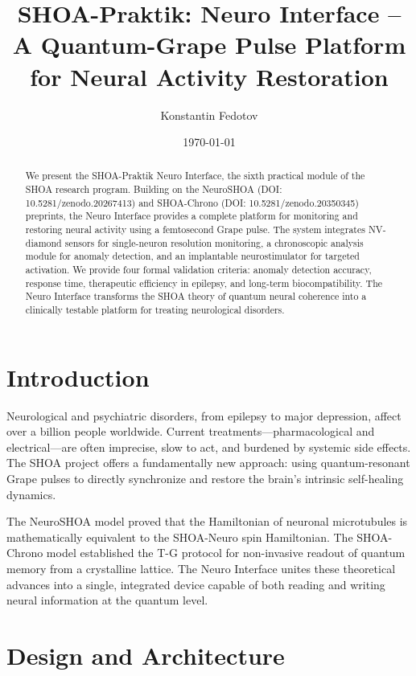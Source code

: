 \documentclass[12pt]{article}
\title{SHOA-Praktik: Neuro Interface -- A Quantum-Grape Pulse Platform for Neural Activity Restoration}
\author{Konstantin Fedotov}
\date{\today}
\begin{document}
\maketitle

\begin{abstract}
We present the SHOA-Praktik Neuro Interface, the sixth practical module of the SHOA research program. Building on the NeuroSHOA (DOI: 10.5281/zenodo.20267413) and SHOA-Chrono (DOI: 10.5281/zenodo.20350345) preprints, the Neuro Interface provides a complete platform for monitoring and restoring neural activity using a femtosecond Grape pulse. The system integrates NV-diamond sensors for single-neuron resolution monitoring, a chronoscopic analysis module for anomaly detection, and an implantable neurostimulator for targeted activation. We provide four formal validation criteria: anomaly detection accuracy, response time, therapeutic efficiency in epilepsy, and long-term biocompatibility. The Neuro Interface transforms the SHOA theory of quantum neural coherence into a clinically testable platform for treating neurological disorders.
\end{abstract}

\section{Introduction}
Neurological and psychiatric disorders, from epilepsy to major depression, affect over a billion people worldwide. Current treatments—pharmacological and electrical—are often imprecise, slow to act, and burdened by systemic side effects. The SHOA project offers a fundamentally new approach: using quantum-resonant Grape pulses to directly synchronize and restore the brain's intrinsic self-healing dynamics.

The NeuroSHOA model proved that the Hamiltonian of neuronal microtubules is mathematically equivalent to the SHOA-Neuro spin Hamiltonian. The SHOA-Chrono model established the T-G protocol for non-invasive readout of quantum memory from a crystalline lattice. The Neuro Interface unites these theoretical advances into a single, integrated device capable of both reading and writing neural information at the quantum level.

\section{Design and Architecture}
\end{document}
